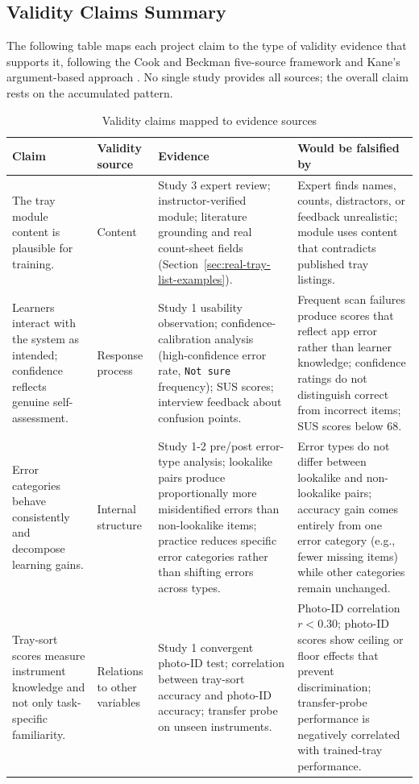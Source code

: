 \documentclass[10pt,a4paper]{article}
\begin{document}
\subsection{Validity Claims Summary}

The following table maps each project claim to the type of validity evidence
that supports it, following the Cook and Beckman five-source framework
\cite{cook-beckman-validity-2006} and Kane's argument-based approach
\cite{kane-validity-2013}. No single study provides all sources; the overall
claim rests on the accumulated pattern.
\begin{table}[H]
\centering
\caption{Validity claims mapped to evidence sources}
\label{tab:validity-claims-mapped-to-evidence-sources}
\small\renewcommand{\arraystretch}{1.2}\setlength{\tabcolsep}{4pt}
\begin{tabularx}{\textwidth}{|>{\raggedright\arraybackslash}X|>{\raggedright\arraybackslash}X|>{\raggedright\arraybackslash}X|>{\raggedright\arraybackslash}X|}
\hline
Claim & Validity source & Evidence & Would be falsified by \\
\hline
The tray module content is plausible for training. & Content & Study 3 expert review; instructor-verified module; literature grounding and real count-sheet fields (Section~\ref{sec:real-tray-list-examples}). & Expert finds names, counts, distractors, or feedback unrealistic; module uses content that contradicts published tray listings. \\
\hline
Learners interact with the system as intended; confidence reflects genuine self-assessment. & Response process & Study 1 usability observation; confidence-calibration analysis (high-confidence error rate, \texttt{Not sure} frequency); SUS scores; interview feedback about confusion points. & Frequent scan failures produce scores that reflect app error rather than learner knowledge; confidence ratings do not distinguish correct from incorrect items; SUS scores below 68. \\
\hline
Error categories behave consistently and decompose learning gains. & Internal structure & Study 1-2 pre/post error-type analysis; lookalike pairs produce proportionally more misidentified errors than non-lookalike items; practice reduces specific error categories rather than shifting errors across types. & Error types do not differ between lookalike and non-lookalike pairs; accuracy gain comes entirely from one error category (e.g., fewer missing items) while other categories remain unchanged. \\
\hline
Tray-sort scores measure instrument knowledge and not only task-specific familiarity. & Relations to other variables & Study 1 convergent photo-ID test; correlation between tray-sort accuracy and photo-ID accuracy; transfer probe on unseen instruments. & Photo-ID correlation $r < 0.30$; photo-ID scores show ceiling or floor effects that prevent discrimination; transfer-probe performance is negatively correlated with trained-tray performance. \\

\end{tabularx}
\end{table}
\end{document}
